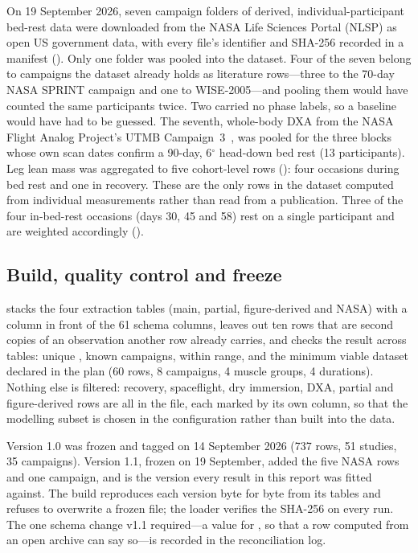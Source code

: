 On 19 September 2026, seven campaign folders of derived, individual-participant bed-rest data were downloaded from
the NASA Life Sciences Portal (NLSP) as open US government data, with every file's identifier and SHA-256 recorded
in a manifest (). Only one folder was pooled into the dataset. Four of the
seven belong to campaigns the dataset already holds as literature rows---three to the 70-day NASA SPRINT campaign and
one to WISE-2005---and pooling them would have counted the same participants twice. Two carried no phase labels, so
a baseline would have had to be guessed. The seventh, whole-body DXA from the NASA Flight Analog Project's UTMB
Campaign~3~\citep{nlsp2026}, was pooled for the three blocks whose own scan dates confirm a 90-day, 6$^\circ$
head-down bed rest (13 participants). Leg lean mass was aggregated to five cohort-level rows
(): four occasions during bed rest and one in recovery. These are the only rows
in the dataset computed from individual measurements rather than read from a publication. Three of the four
in-bed-rest occasions (days 30, 45 and 58) rest on a single participant and are weighted accordingly
().

\subsection{Build, quality control and freeze}
\label{sec:freeze}

 stacks the four extraction tables (main, partial, figure-derived and NASA) with a
 column in front of the 61 schema columns, leaves out ten rows that are second copies of an
observation another row already carries, and checks the result across tables: unique , known
campaigns,  within range, and the minimum viable dataset declared in the plan (60 rows, 8
campaigns, 4 muscle groups, 4 durations). Nothing else is filtered: recovery, spaceflight, dry immersion, DXA,
partial and figure-derived rows are all in the file, each marked by its own column, so that the modelling subset
is chosen in the configuration rather than built into the data.

Version 1.0 was frozen and tagged on 14 September 2026 (737 rows, 51 studies, 35 campaigns). Version 1.1, frozen
on 19 September, added the five NASA rows and one campaign, and is the version every result in this report was
fitted against. The build reproduces each version byte for byte from its tables and refuses to overwrite a frozen
file; the loader verifies the SHA-256 on every run. The one schema change v1.1 required---a 
value for , so that a row computed from an open archive can say so---is recorded in the
reconciliation log. 

